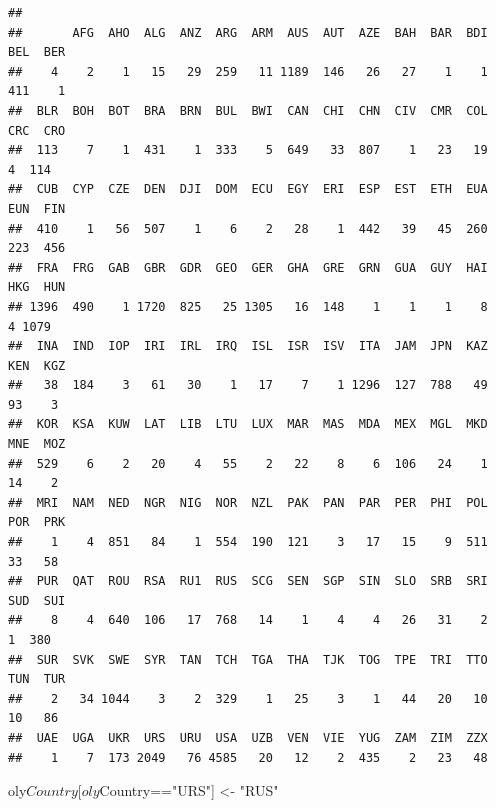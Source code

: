 \documentclass[]{book}
\newenvironment{Shaded}{\begin{snugshade}}{\end{snugshade}}
\newcommand{\KeywordTok}[1]{\textcolor[rgb]{0.13,0.29,0.53}{\textbf{{#1}}}}
\newcommand{\DataTypeTok}[1]{\textcolor[rgb]{0.13,0.29,0.53}{{#1}}}
\newcommand{\StringTok}[1]{\textcolor[rgb]{0.31,0.60,0.02}{{#1}}}
\newcommand{\NormalTok}[1]{{#1}}
\begin{document}
\begin{Shaded}
\end{Shaded}

\begin{verbatim}
## 
##       AFG  AHO  ALG  ANZ  ARG  ARM  AUS  AUT  AZE  BAH  BAR  BDI  BEL  BER 
##    4    2    1   15   29  259   11 1189  146   26   27    1    1  411    1 
##  BLR  BOH  BOT  BRA  BRN  BUL  BWI  CAN  CHI  CHN  CIV  CMR  COL  CRC  CRO 
##  113    7    1  431    1  333    5  649   33  807    1   23   19    4  114 
##  CUB  CYP  CZE  DEN  DJI  DOM  ECU  EGY  ERI  ESP  EST  ETH  EUA  EUN  FIN 
##  410    1   56  507    1    6    2   28    1  442   39   45  260  223  456 
##  FRA  FRG  GAB  GBR  GDR  GEO  GER  GHA  GRE  GRN  GUA  GUY  HAI  HKG  HUN 
## 1396  490    1 1720  825   25 1305   16  148    1    1    1    8    4 1079 
##  INA  IND  IOP  IRI  IRL  IRQ  ISL  ISR  ISV  ITA  JAM  JPN  KAZ  KEN  KGZ 
##   38  184    3   61   30    1   17    7    1 1296  127  788   49   93    3 
##  KOR  KSA  KUW  LAT  LIB  LTU  LUX  MAR  MAS  MDA  MEX  MGL  MKD  MNE  MOZ 
##  529    6    2   20    4   55    2   22    8    6  106   24    1   14    2 
##  MRI  NAM  NED  NGR  NIG  NOR  NZL  PAK  PAN  PAR  PER  PHI  POL  POR  PRK 
##    1    4  851   84    1  554  190  121    3   17   15    9  511   33   58 
##  PUR  QAT  ROU  RSA  RU1  RUS  SCG  SEN  SGP  SIN  SLO  SRB  SRI  SUD  SUI 
##    8    4  640  106   17  768   14    1    4    4   26   31    2    1  380 
##  SUR  SVK  SWE  SYR  TAN  TCH  TGA  THA  TJK  TOG  TPE  TRI  TTO  TUN  TUR 
##    2   34 1044    3    2  329    1   25    3    1   44   20   10   10   86 
##  UAE  UGA  UKR  URS  URU  USA  UZB  VEN  VIE  YUG  ZAM  ZIM  ZZX 
##    1    7  173 2049   76 4585   20   12    2  435    2   23   48
\end{verbatim}

\begin{Shaded}
\begin{Highlighting}[]
\NormalTok{oly$Country[oly$Country==}\StringTok{"URS"}\NormalTok{] <-}\StringTok{ "RUS"}
\end{Highlighting}
\end{Shaded}

\begin{Shaded}
\end{Shaded}
\end{document}
